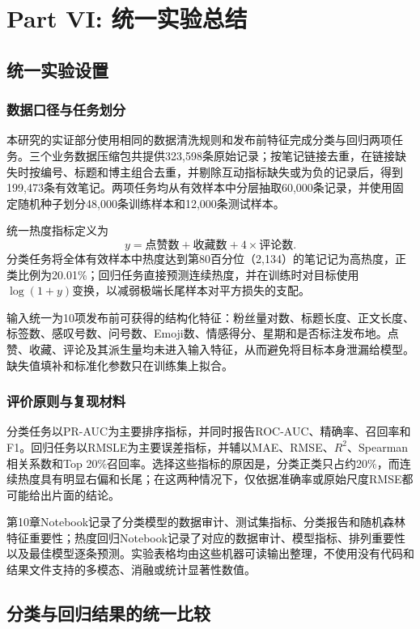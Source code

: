 \part{Part VI: 统一实验总结}

\chapter{统一实验设置}

\section{数据口径与任务划分}
本研究的实证部分使用相同的数据清洗规则和发布前特征完成分类与回归两项任务。三个业务数据压缩包共提供323,598条原始记录；按笔记链接去重，在链接缺失时按编号、标题和博主组合去重，并剔除互动指标缺失或为负的记录后，得到199,473条有效笔记。两项任务均从有效样本中分层抽取60,000条记录，并使用固定随机种子划分48,000条训练样本和12,000条测试样本。

统一热度指标定义为
\begin{equation}
	y=\text{点赞数}+\text{收藏数}+4\times\text{评论数}.
\end{equation}
分类任务将全体有效样本中热度达到第80百分位（2,134）的笔记记为高热度，正类比例为20.01\%；回归任务直接预测连续热度，并在训练时对目标使用$\log(1+y)$变换，以减弱极端长尾样本对平方损失的支配。

输入统一为10项发布前可获得的结构化特征：粉丝量对数、标题长度、正文长度、标签数、感叹号数、问号数、Emoji数、情感得分、星期和是否标注发布地。点赞、收藏、评论及其派生量均未进入输入特征，从而避免将目标本身泄漏给模型。缺失值填补和标准化参数只在训练集上拟合。

\section{评价原则与复现材料}
分类任务以PR-AUC为主要排序指标，并同时报告ROC-AUC、精确率、召回率和F1。回归任务以RMSLE为主要误差指标，并辅以MAE、RMSE、$R^2$、Spearman相关系数和Top 20\%召回率。选择这些指标的原因是，分类正类只占约20\%，而连续热度具有明显右偏和长尾；在这两种情况下，仅依据准确率或原始尺度RMSE都可能给出片面的结论。

第10章Notebook记录了分类模型的数据审计、测试集指标、分类报告和随机森林特征重要性；热度回归Notebook记录了对应的数据审计、模型指标、排列重要性以及最佳模型逐条预测。实验表格均由这些机器可读输出整理，不使用没有代码和结果文件支持的多模态、消融或统计显著性数值。

\chapter{分类与回归结果的统一比较}

